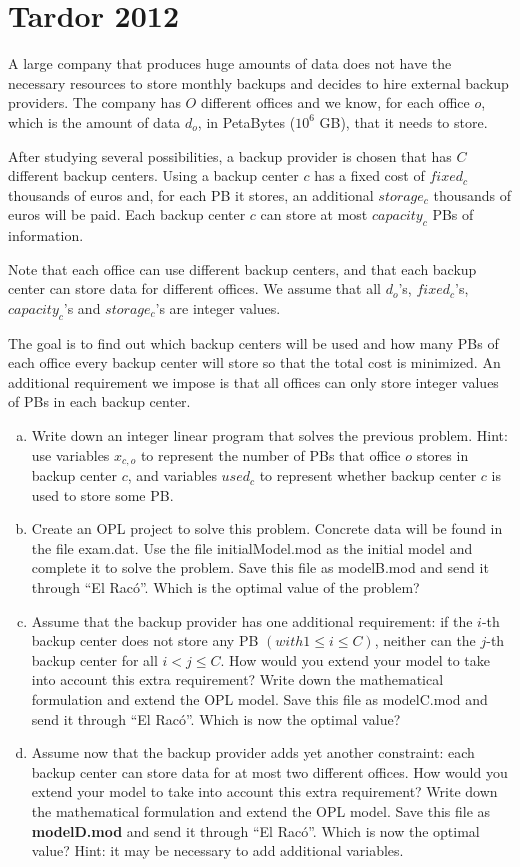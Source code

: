\documentclass[11pt, oneside]{article}   	%
\begin{document}
\section{Tardor 2012}

A large company that produces huge amounts of data does not have the necessary resources to store monthly backups and decides to hire external backup providers. The company has $O$ different offices and we know, for each office $o$, which is the amount of data $d_o$, in PetaBytes ($10^6$ GB), that it needs to store.

After studying several possibilities, a backup provider is chosen that has $C$ different backup centers. Using a backup center $c$ has a fixed cost of $fixed_c$ thousands of euros and, for each PB it stores, an additional $storage_c$ thousands of euros will be paid. Each backup center $c$ can store at most $capacity_c$ PBs of information.

Note that each office can use different backup centers, and that each backup center can store data for different offices. We assume that all $d_o$’s, $fixed_c$’s, $capacity_c$’s and $storage_c$’s are integer values.

The goal is to find out which backup centers will be used and how many PBs of each office every backup center will store so that the total cost is minimized. An additional requirement we impose is that all offices can only store integer values of PBs in each backup center.

\begin{enumerate}[(a)]
\item Write down an integer linear program that solves the previous problem. Hint: use variables $x_{c,o}$ to represent the number of PBs that office $o$ stores in backup center $c$, and variables $used_c$ to represent whether backup center $c$ is used to store some PB.
\item Create an OPL project to solve this problem. Concrete data will be found in the file exam.dat. Use the file initialModel.mod as the initial model and complete it to solve the problem. Save this file as modelB.mod and send it through “El Racó”. Which is the optimal value of the problem?
\item Assume that the backup provider has one additional requirement: if the $i$-th backup center does not store any PB $(with 1 \leq i \leq C)$, neither can the $j$-th backup center for all $i  < j \leq C$. How would you extend your model to take into account this extra requirement? Write down the mathematical formulation and extend the OPL model. Save this file as modelC.mod and send it through “El Racó”. Which is now the optimal value?
\item Assume now that the backup provider adds yet another constraint: each backup center can store data for at most two different offices. How would you extend your model to take into account this extra requirement? Write down the mathematical formulation and extend the OPL model. Save this file as {\bf modelD.mod} and send it through “El Racó”. Which is now the optimal value? Hint: it may be necessary to add additional variables.
\end{enumerate}
\end{document}
